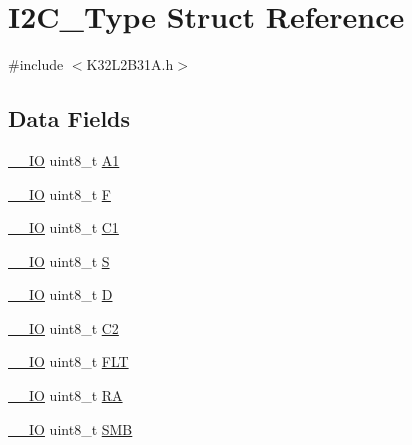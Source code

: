 \hypertarget{struct_i2_c___type}{}\section{I2\+C\+\_\+\+Type Struct Reference}
\label{struct_i2_c___type}


{\ttfamily \#include $<$K32\+L2\+B31\+A.\+h$>$}

\subsection*{Data Fields}
\begin{DoxyCompactItemize}
\item 
\mbox{\hyperlink{core__cm0plus_8h_aec43007d9998a0a0e01faede4133d6be}{\+\_\+\+\_\+\+IO}} uint8\+\_\+t \mbox{\hyperlink{struct_i2_c___type_acb6a1bc3db8fa6148894140daa6b97e1}{A1}}
\item 
\mbox{\hyperlink{core__cm0plus_8h_aec43007d9998a0a0e01faede4133d6be}{\+\_\+\+\_\+\+IO}} uint8\+\_\+t \mbox{\hyperlink{struct_i2_c___type_a59168eda4690de8b4b61d6b940d010a6}{F}}
\item 
\mbox{\hyperlink{core__cm0plus_8h_aec43007d9998a0a0e01faede4133d6be}{\+\_\+\+\_\+\+IO}} uint8\+\_\+t \mbox{\hyperlink{struct_i2_c___type_ad54aa92be9fc988e74d55d2d3daae8ad}{C1}}
\item 
\mbox{\hyperlink{core__cm0plus_8h_aec43007d9998a0a0e01faede4133d6be}{\+\_\+\+\_\+\+IO}} uint8\+\_\+t \mbox{\hyperlink{struct_i2_c___type_a0542ffc7618a0893938748eef9c87474}{S}}
\item 
\mbox{\hyperlink{core__cm0plus_8h_aec43007d9998a0a0e01faede4133d6be}{\+\_\+\+\_\+\+IO}} uint8\+\_\+t \mbox{\hyperlink{struct_i2_c___type_a6c0edcafd91c3baa698617799de6ec35}{D}}
\item 
\mbox{\hyperlink{core__cm0plus_8h_aec43007d9998a0a0e01faede4133d6be}{\+\_\+\+\_\+\+IO}} uint8\+\_\+t \mbox{\hyperlink{struct_i2_c___type_a4f920936a8fc32483b3ebd9b0674b450}{C2}}
\item 
\mbox{\hyperlink{core__cm0plus_8h_aec43007d9998a0a0e01faede4133d6be}{\+\_\+\+\_\+\+IO}} uint8\+\_\+t \mbox{\hyperlink{struct_i2_c___type_a1150d16f9855062058c3b12511dcd188}{F\+LT}}
\item 
\mbox{\hyperlink{core__cm0plus_8h_aec43007d9998a0a0e01faede4133d6be}{\+\_\+\+\_\+\+IO}} uint8\+\_\+t \mbox{\hyperlink{struct_i2_c___type_ae9dab8ef1aad113e4a4f83a1dc78e357}{RA}}
\item 
\mbox{\hyperlink{core__cm0plus_8h_aec43007d9998a0a0e01faede4133d6be}{\+\_\+\+\_\+\+IO}} uint8\+\_\+t \mbox{\hyperlink{struct_i2_c___type_a7da5c460cfe30d313f3f057de44ae6b6}{S\+MB}}

\end{DoxyCompactItemize}
